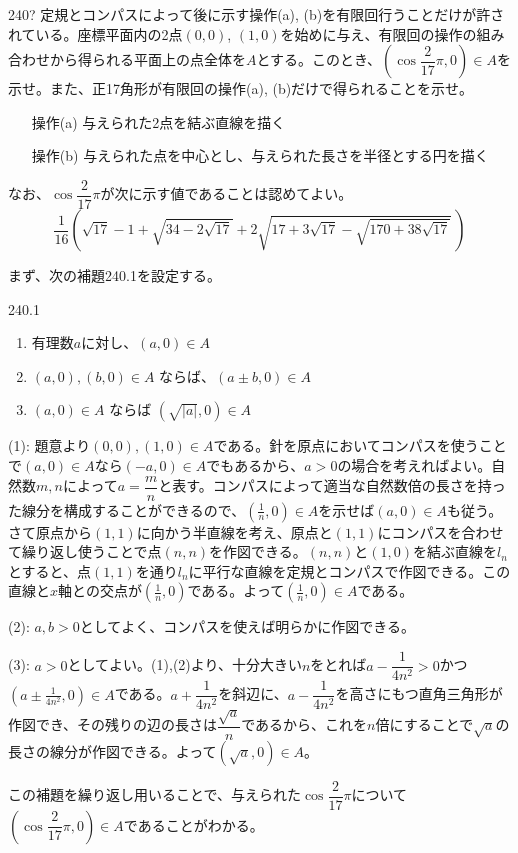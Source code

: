 \begin{thm}{240}{\hosi ?}{}
 定規とコンパスによって後に示す操作(a), (b)を有限回行うことだけが許されている。座標平面内の2点$(0,0)$, $(1,0)$を始めに与え、有限回の操作の組み合わせから得られる平面上の点全体を$A$とする。このとき、$(\cos\dfrac{2}{17}\pi,0)\in A$を示せ。また、正17角形が有限回の操作(a), (b)だけで得られることを示せ。

 \begin{itemize}
  \setlength{\leftskip}{3eM}
  \item[操作(a)] 与えられた2点を結ぶ直線を描く
  \item[操作(b)] 与えられた点を中心とし、与えられた長さを半径とする円を描く
 \end{itemize}

 なお、$\cos\dfrac{2}{17}\pi$が次に示す値であることは認めてよい。
 \[ \!\!\frac{1}{16}\!\!\left(\!\sqrt{17}-1\!+\!\sqrt{34-2\sqrt{17}}+2\sqrt{17\!+\!3\sqrt{17}\!-\!\sqrt{170\!+\!38\sqrt{17}}}\,\right) \]
\end{thm}

まず、次の補題240.1を設定する。
\begin{subthm}{240.1}
 \begin{enumerate}
  \item 有理数$a$に対し、$(a,0)\in A$
  \item $(a,0), (b,0) \in A$ ならば、$(a\pm b, 0) \in A$
  \item $(a,0)\in A$ ならば $(\sqrt{|a|},0) \in A$
 \end{enumerate}
\end{subthm}
(1): 題意より$(0,0), (1,0) \in A$である。針を原点においてコンパスを使うことで$(a,0)\in A$なら$(-a,0) \in A$でもあるから、$a>0$の場合を考えればよい。自然数$m,n$によって$a=\dfrac{m}{n}$と表す。コンパスによって適当な自然数倍の長さを持った線分を構成することができるので、$(\frac{1}{n},0)\in A$を示せば$(a,0)\in A$も従う。さて原点から$(1,1)$に向かう半直線を考え、原点と$(1,1)$にコンパスを合わせて繰り返し使うことで点$(n,n)$を作図できる。$(n,n)$と$(1,0)$を結ぶ直線を$l_n$とすると、点$(1,1)$を通り$l_n$に平行な直線を定規とコンパスで作図できる。この直線と$x$軸との交点が$(\frac{1}{n},0)$である。よって$(\frac{1}{n},0)\in A$である。

(2): $a,b>0$としてよく、コンパスを使えば明らかに作図できる。

(3): $a>0$としてよい。(1),(2)より、十分大きい$n$をとれば$a-\dfrac{1}{4n^2}>0$かつ $(a\pm\frac{1}{4n^2},0) \in A$である。$a+\dfrac{1}{4n^2}$を斜辺に、$a-\dfrac{1}{4n^2}$を高さにもつ直角三角形が作図でき、その残りの辺の長さは$\dfrac{\sqrt{a}}{n}$であるから、これを$n$倍にすることで$\sqrt{a}$の長さの線分が作図できる。よって$(\sqrt{a},0) \in A$。

この補題を繰り返し用いることで、与えられた$\cos\dfrac{2}{17}\pi$について$(\cos\dfrac{2}{17}\pi,0) \in A$であることがわかる。